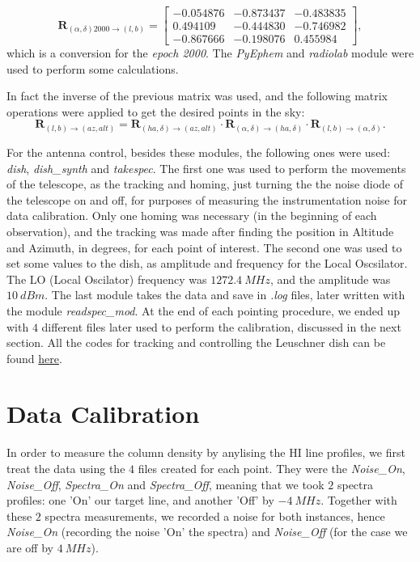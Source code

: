 \documentclass{article}
\begin{document}
\begin{equation}
\mathbf{R}_{(\alpha,\delta)2000\rightarrow(l,b)} =
 \begin{bmatrix}
  -0.054876 & -0.873437 & -0.483835 \\
  0.494109  &  -0.444830 & -0.746982 \\  
  -0.867666 &  -0.198076 & 0.455984
 \end{bmatrix},
\end{equation}
which is a conversion for the \emph{epoch 2000}. The \emph{PyEphem} and 
\emph{radiolab} module were used to perform some calculations.

In fact the inverse of the previous matrix was used, and the following
matrix operations were applied to get the desired points in the sky:
\begin{equation}
\mathbf{R}_{(l, b) \rightarrow (az, alt)}=\mathbf{R}_{(ha, \delta) \rightarrow(az, alt)} \cdot \mathbf{R}_{(\alpha, \delta)\rightarrow (ha, \delta)} \cdot \mathbf{R}_{(l,b)\rightarrow(\alpha,\delta)}.
\label{eq:conv}
\end{equation}

For the antenna control, besides these modules, the following ones were used: 
\emph{dish}, \emph{dish\_synth} and \emph{takespec}. The first one was used to perform 
the movements of the telescope, as the tracking and homing, 
just turning the the noise diode of the telescope on and off, for purposes of measuring
the instrumentation noise for data calibration. Only one homing was necessary (in the beginning 
of each observation), and the tracking was made after finding the position in Altitude and
Azimuth, in degrees, for each point of interest. The second one was used to set some
values to the dish, as amplitude and frequency for the Local Oscsilator. The LO (Local Oscilator) frequency 
was $1272.4 \ MHz$, and the amplitude was $10 \ dBm$. The last module
takes the data and save in \emph{.log} files, later written with the module
\emph{readspec\_mod}. At the end of each pointing procedure, we ended up
with $4$ different files later used to perform the calibration, discussed in the next section.
All the codes for tracking and controlling the Leuschner dish can be found 
\href{https://github.com/leosattler/ugradio/tree/master/lab\_dish}{here}.

\section{Data Calibration}

In order to measure the column density by anylising the HI line profiles, we first treat the data
using the $4$ files created for each point. They were the \emph{Noise\_On}, \emph{Noise\_Off}, 
\emph{Spectra\_On} and \emph{Spectra\_Off}, meaning that we took $2$ spectra profiles: one 'On'
our target line, and another 'Off' by $-4 \ MHz$. Together with these $2$ spectra measurements,
we recorded a noise for both instances, hence \emph{Noise\_On} (recording the noise 'On' the
spectra) and \emph{Noise\_Off} (for the case we are off by $4 \ MHz$).
\end{document}
